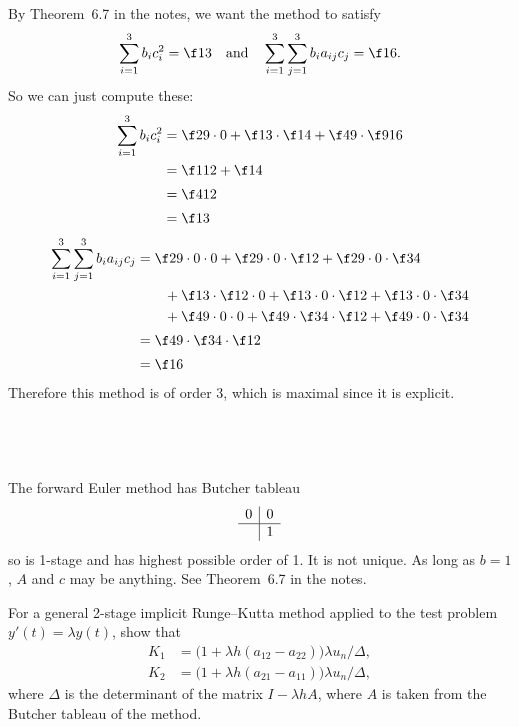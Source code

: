 \documentclass[a4paper]{article}
\begin{document}
\subsection{~} %

By Theorem~6.7 in the notes, we want the method to satisfy \[
\sum_{i=1}^3 b_i c_i^2 = \f13 \quad\text{and}\quad \sum_{i=1}^3 \sum_{j=1}^3 b_i a_{ij} c_j = \f16.
\] So we can just compute these:
\begin{align*}
\sum_{i=1}^3 b_i c_i^2 &= \f29 \cdot 0 + \f13 \cdot \f14 + \f49 \cdot \f9{16} \\
&= \f1{12} + \f14 \\[0.5ex]
&= \f4{12} \\[0.5ex]
&= \f13
\end{align*}
\begin{align*}
\sum_{i=1}^3 \sum_{j=1}^3 b_i a_{ij} c_j &=
    \f29 \cdot 0 \cdot 0 + \f29 \cdot 0 \cdot \f12 + \f29 \cdot 0 \cdot \f34 \\
    &\qquad + \f13 \cdot \f12 \cdot 0 + \f13 \cdot 0 \cdot \f12 + \f13 \cdot 0 \cdot \f34 \\
    &\qquad + \f49 \cdot 0 \cdot 0 + \f49 \cdot \f34 \cdot \f12 + \f49 \cdot 0 \cdot \f34 \\[0.5ex]
&= \f49 \cdot \f34 \cdot \f12 \\[0.5ex]
&= \f16
\end{align*}
Therefore this method is of order 3, which is maximal since it is explicit.

\subsection{~} %

The forward Euler method has Butcher tableau \[
\begin{array}{c|c} %
0 & 0 \\
\hline %
& 1
\end{array}
\] so is 1-stage and has highest possible order of 1. It is not unique. As long as $b = 1$, $A$ and $c$ may be anything. See Theorem~6.7 in the notes.





\begin{questionbody}
For a general 2-stage implicit Runge--Kutta method applied to the test problem $y'(t) = \lambda y(t)$, show that %
\begin{align*}
K_1 &= \big( 1 + \lambda h (a_{12} - a_{22}) \big) \lambda u_n / \Delta, \\
K_2 &= \big( 1 + \lambda h (a_{21} - a_{11}) \big) \lambda u_n / \Delta,
\end{align*}
where $\Delta$ is the determinant of the matrix $I - \lambda h A$, where $A$ is taken from the Butcher tableau of the method.
\end{questionbody}
\end{document}
